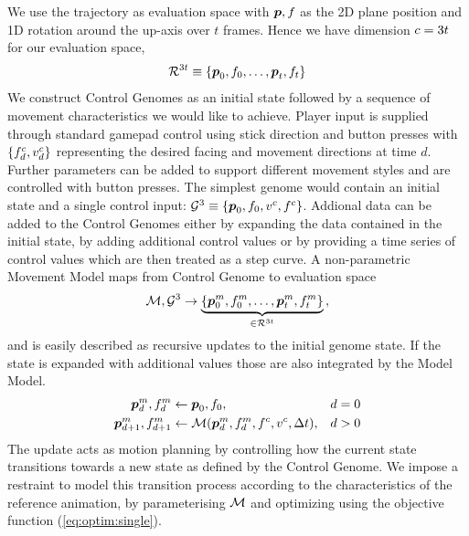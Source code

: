 We use the trajectory as evaluation space with $\boldsymbol{p },f$ as the 2D plane position and 1D rotation around the up-axis over $t$ frames. Hence we have dimension $c = 3 t$ for our evaluation space,
\begin{align}
\mathcal{R}^{3 t} 
\equiv 
\left\{
    \boldsymbol{p }_0,f_0,
    \ldots,
    \boldsymbol{p }_t,f_t
    \right\}
\end{align}
We construct Control Genomes as an initial state followed by a sequence of movement characteristics we would like to achieve. Player input is supplied through standard gamepad control using stick direction and button presses with $\left\{ f^c_d, v^c_d\right\}$ representing the desired facing and movement directions at time $d$. Further parameters can be added to support different movement styles and are controlled with button presses. The simplest genome would contain an initial state and a single control input: $\mathcal{G}^3 \equiv \left\{ \boldsymbol{p }_0,f_0,v^c,f^c \right\}$. Addional data can be added to the Control Genomes either by expanding the data contained in the initial state, by adding additional control values or by providing a time series of control values which are then treated as a step curve. A non-parametric Movement Model maps from Control Genome to evaluation space
\begin{equation}
    \mathcal{M},\mathcal{G}^3
    \rightarrow
    \underbrace{
    \left\{
    \boldsymbol{p }_0^m,f_0^m,\ldots,\boldsymbol{p }_t^m,f_t^m\right\}
    }_{\in \mathcal{R}^{3t}}
    \,,
\end{equation}
and is easily described as recursive updates to the initial genome state. If the state is expanded with additional values those are also integrated by the Model Model. 
\begin{subequations}
\begin{align}
    \boldsymbol{p }_d^m,f_d^m
    &\leftarrow
    \boldsymbol{p }_0,f_0,&d=0
    \\
    \boldsymbol{p }_{d+1}^m,f_{d+1}^m
    &\leftarrow
    \mathcal{M}
    (
    \boldsymbol{p }_d^m,f_d^m,f^c,v^c,\Delta{t}
    )
    \label{eq:move:update},&d>0
\end{align}
\end{subequations}
The update  acts as motion planning by controlling how the current state transitions towards a new state as defined by the Control Genome. We impose a restraint to model this transition process according to the characteristics of the reference animation, by parameterising $\mathcal{M}$ and optimizing using the objective function (\ref{eq:optim:single}). 

